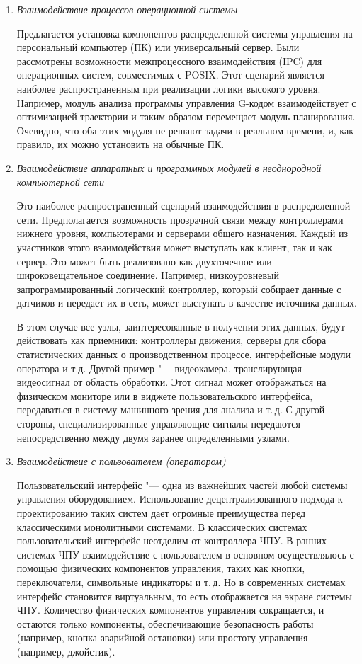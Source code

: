 \begin{enumerate}
\item\textit{Взаимодействие процессов операционной системы}

Предлагается установка компонентов распределенной системы управления на персональный компьютер (ПК) или универсальный сервер. Были рассмотрены возможности межпроцессного взаимодействия (IPC) для операционных систем, совместимых с POSIX. Этот сценарий является наиболее распространенным при реализации логики высокого уровня. Например, модуль анализа программы управления G-кодом взаимодействует с оптимизацией траектории и таким образом перемещает модуль планирования. Очевидно, что оба этих модуля не решают задачи в реальном времени, и, как правило, их можно установить на обычные ПК.

\item\textit{Взаимодействие аппаратных и программных модулей в неоднородной компьютерной сети}

Это наиболее распространенный сценарий взаимодействия в распределенной сети. Предполагается возможность прозрачной связи между контроллерами нижнего уровня, компьютерами и серверами общего назначения. Каждый из участников этого взаимодействия может выступать как клиент, так и как сервер. Это может быть реализовано как двухточечное или широковещательное соединение. Например, низкоуровневый запрограммированный логический контроллер, который собирает данные с датчиков и передает их в сеть, может выступать в качестве источника данных.

В этом случае все узлы, заинтересованные в получении этих данных, будут действовать как приемники: контроллеры движения, серверы для сбора статистических данных о производственном процессе, интерфейсные модули оператора и т.д. Другой пример "--- видеокамера, транслирующая видеосигнал от область обработки. Этот сигнал может отображаться на физическом мониторе или в виджете пользовательского интерфейса, передаваться в систему машинного зрения для анализа и т.\,д. С другой стороны, специализированные управляющие сигналы передаются непосредственно между двумя заранее определенными узлами.

\item\textit{Взаимодействие с пользователем (оператором)}

Пользовательский интерфейс "--- одна из важнейших частей любой системы управления оборудованием. Использование децентрализованного подхода к проектированию таких систем дает огромные преимущества перед классическими монолитными системами. В классических системах пользовательский интерфейс неотделим от контроллера ЧПУ. В ранних системах ЧПУ взаимодействие с пользователем в основном осуществлялось с помощью физических компонентов управления, таких как кнопки, переключатели, символьные индикаторы и т.\,д. Но в современных системах интерфейс становится виртуальным, то есть отображается на экране системы ЧПУ. Количество физических компонентов управления сокращается, и остаются только компоненты, обеспечивающие безопасность работы (например, кнопка аварийной остановки) или простоту управления (например, джойстик).


\end{enumerate}
